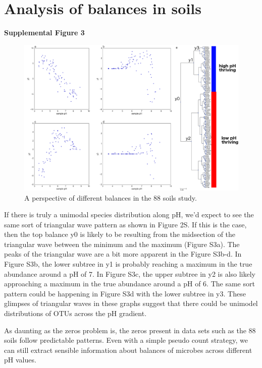 \section{Analysis of balances in soils}
\textbf{Supplemental Figure 3}

\begin{figure}[H]
        \centering
        \includegraphics[width=1\textwidth]{appendix_b/sup_figure3.png}
        \caption[Other balances from the 88 soils study.]{A perspective of different balances in the 88 soils study.}
        \label{figbS3}
\end{figure}

If there is truly a unimodal species distribution along pH, we’d expect to see the same sort of triangular wave pattern as shown in Figure 2S.  If this is the case, then the top balance y0 is likely to be resulting from the midsection of the triangular wave between the minimum and the maximum (Figure S3a).  The peaks of the triangular wave are a bit more apparent in the Figure S3b-d.  In Figure S3b, the lower subtree in y1 is probably reaching a maximum in the true abundance around a pH of 7.  In Figure S3c, the upper subtree in y2 is also likely approaching a maximum in the true abundance around a pH of 6.  The same sort pattern could be happening in Figure S3d with the lower subtree in y3.  These glimpses of triangular waves in these graphs suggest that there could be unimodel distributions of OTUs across the pH gradient.

As daunting as the zeros problem is, the zeros present in data sets such as the 88 soils follow predictable patterns.  Even with a simple pseudo count strategy, we can still extract sensible information about balances of microbes across different pH values.
